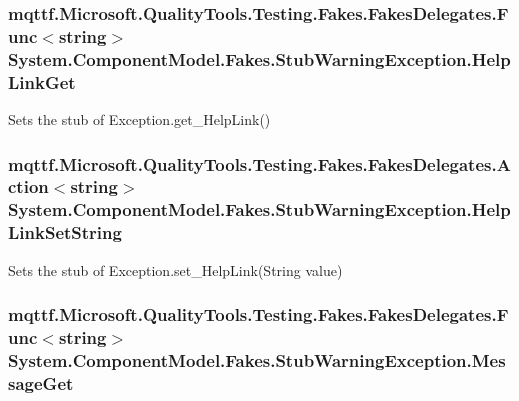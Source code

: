 \hypertarget{class_system_1_1_component_model_1_1_fakes_1_1_stub_warning_exception_a6e006bacf989a5aa0e340f4fff0bb7dd}{
\subsubsection[{Help\-Link\-Get}]{\setlength{\rightskip}{0pt plus 5cm}mqttf.\-Microsoft.\-Quality\-Tools.\-Testing.\-Fakes.\-Fakes\-Delegates.\-Func$<$string$>$ System.\-Component\-Model.\-Fakes.\-Stub\-Warning\-Exception.\-Help\-Link\-Get}}\label{class_system_1_1_component_model_1_1_fakes_1_1_stub_warning_exception_a6e006bacf989a5aa0e340f4fff0bb7dd}


Sets the stub of Exception.\-get\-\_\-\-Help\-Link()

\hypertarget{class_system_1_1_component_model_1_1_fakes_1_1_stub_warning_exception_abf1745f284700178c59ffb9f374c3064}{
\subsubsection[{Help\-Link\-Set\-String}]{\setlength{\rightskip}{0pt plus 5cm}mqttf.\-Microsoft.\-Quality\-Tools.\-Testing.\-Fakes.\-Fakes\-Delegates.\-Action$<$string$>$ System.\-Component\-Model.\-Fakes.\-Stub\-Warning\-Exception.\-Help\-Link\-Set\-String}}\label{class_system_1_1_component_model_1_1_fakes_1_1_stub_warning_exception_abf1745f284700178c59ffb9f374c3064}


Sets the stub of Exception.\-set\-\_\-\-Help\-Link(\-String value)

\hypertarget{class_system_1_1_component_model_1_1_fakes_1_1_stub_warning_exception_aaf1a29f8fb355b3cacf8e92e3d574d52}{
\subsubsection[{Message\-Get}]{\setlength{\rightskip}{0pt plus 5cm}mqttf.\-Microsoft.\-Quality\-Tools.\-Testing.\-Fakes.\-Fakes\-Delegates.\-Func$<$string$>$ System.\-Component\-Model.\-Fakes.\-Stub\-Warning\-Exception.\-Message\-Get}}\label{class_system_1_1_component_model_1_1_fakes_1_1_stub_warning_exception_aaf1a29f8fb355b3cacf8e92e3d574d52}



